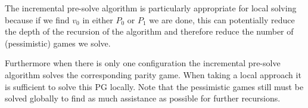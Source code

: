 The incremental pre-solve algorithm is particularly appropriate for local solving because if we find $v_0$ in either $P_0$ or $P_1$ we are done, this can potentially reduce the depth of the recursion of the algorithm and therefore reduce the number of (pessimistic) games we solve.

Furthermore when there is only one configuration the incremental pre-solve algorithm solves the corresponding parity game. When taking a local approach it is sufficient to solve this PG locally. Note that the pessimistic games still must be solved globally to find as much assistance as possible for further recursions.